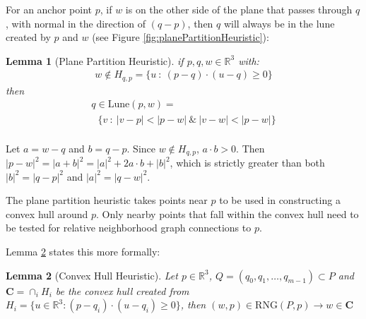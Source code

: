 \documentclass[a4paper,fleqn]{cas-dc}
\begin{document}

\newtheorem{theorem}{Theorem}
\newtheorem{lemma}[theorem]{Lemma}



For an anchor point $p$, if $w$ is on the other side of the plane that passes through $q$,
with normal in the direction of $(q-p)$,
then $q$ will always be in the lune created by $p$ and $w$ (see Figure \ref{fig:planePartitionHeuristic}):


\begin{lemma}[Plane Partition Heuristic]
  \label{lemma:plane}
  if $p,q,w \in \mathbb{R}^3$ with:
  $$
  \begin{array}{l}
  w \notin H  _ {q,p} = \{ u \ :  \ (p-q) \cdot (u - q) \ge 0 \}
  \end{array}
  $$
  then
  $$
  \begin{array}{l}
    q \in \text{Lune}(p,w)  = \\
      \ \ \ \{ v \ : \ |v-p| < |p-w| \ \& \ |v-w| < |p-w| \}\\
  \end{array}
  $$
\end{lemma}

\begin{pf}
  Let $a = w - q$ and $b = q - p$.
  Since $w \notin H _ {q,p}$, $a \cdot b > 0$.
  Then $|p-w|^2 = |a + b|^2 = |a|^2 + 2 a \cdot b + |b|^2$,
  which is strictly greater than both $|b|^2 = |q-p|^2$ and $|a|^2 = |q-w|^2$.
\end{pf}

The plane partition heuristic takes points near $p$ to be used in constructing a
convex hull around $p$.
Only nearby points that fall within the convex hull need to be tested for relative
neighborhood graph connections to $p$.

Lemma \ref{lemma:hull} states this more formally:


\begin{lemma}[Convex Hull Heuristic]
  \label{lemma:hull}
  Let $p \in \mathbb{R}^3$, $Q = (q _ 0, q _ 1, \dots, q _ {m-1}) \subset P$ and $\mathbf{C} = \cap _ i H _ i$ be the
  convex hull created from $H _ i = \{ u \in \mathbb{R}^3 : (p - q _ i) \cdot (u - q _ i) \ge 0 \}$,
  then $(w,p) \in \text{RNG}(P,p) \to w \in \mathbf{C}$
\end{lemma}
\end{document}
